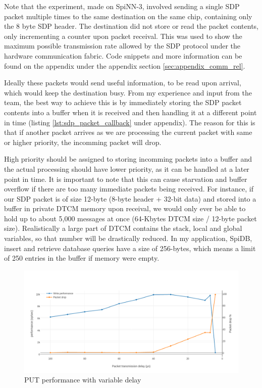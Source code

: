 Note that the experiment, made on SpiNN-3, involved sending a single SDP packet multiple times to the same destination on the same chip, containing only the 8 byte SDP header. The destination did not store or read the packet contents, only incrementing a counter upon packet receival. This was used to show the maximum possible transmission rate allowed by the SDP protocol under the hardware communication fabric. Code snippets and more information can be found on the appendix under the appendix section \ref{sec:appendix_comm_rel}.

Ideally these packets would send useful information, to be read upon arrival, which would keep the destination busy. From my experience and input from the team, the best way to achieve this is by immediately storing the SDP packet contents into a buffer when it is received and then handling it at a different point in time (listing \ref{lst:sdp_packet_callback} under appendix). The reason for this is that if another packet arrives as we are processing the current packet with same or higher priority, the incomming packet will drop.

High priority should be assigned to storing incomming packets into a buffer and the actual processing should have lower priority, as it can be handled at a later point in time. It is important to note that this can cause starvation and buffer overflow if there are too many immediate packets being received. For instance, if our SDP packet is of size 12-byte (8-byte header + 32-bit data) and stored into a buffer in private DTCM memory upon receival, we would only ever be able to hold up to about 5,000 messages at once (64-Kbytes DTCM size / 12-byte packet size). Realistically a large part of DTCM contains the stack, local and global variables, so that number will be drastically reduced. In my application, SpiDB, insert and retrieve database queries have a size of 256-bytes, which means a limit of 250 entries in the buffer if memory were empty.

\begin{figure}
\begin{center}
	\includegraphics[width=1.3\textwidth, natwidth=1063, natheight=509]{images/transmission_delay.png}
\end{center}
\caption{PUT performance with variable delay}
\label{fig:transmission-delay}
\end{figure}
	
